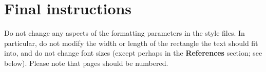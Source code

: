 \documentclass{article}
\begin{document}
\section{Final instructions}

Do not change any aspects of the formatting parameters in the style files.  In
particular, do not modify the width or length of the rectangle the text should
fit into, and do not change font sizes (except perhaps in the
\textbf{References} section; see below). Please note that pages should be
numbered.






\end{document}
